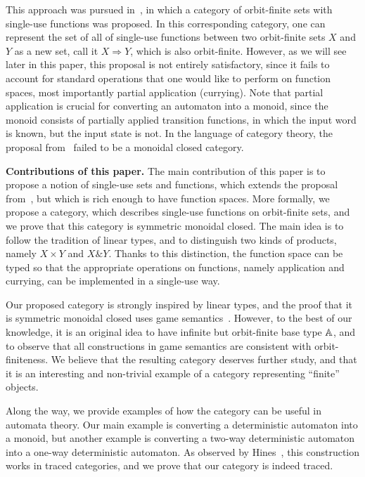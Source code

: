 This approach was pursued in~\cite{stefanski-phd}, in which a category of orbit-finite sets with single-use functions was proposed. In this corresponding category,  one can represent the set of all of single-use functions between two orbit-finite sets $X$ and $Y$ as a new set, call it $X \Rightarrow Y$, which is  also orbit-finite.  However, as we will see later in this paper, this proposal is not entirely satisfactory, since it fails to account for standard operations that one would like to perform on function spaces, most importantly partial application (currying). Note that partial application is crucial for converting an automaton into a monoid, since the monoid consists of partially applied transition functions, in which the input word is known, but the input state is not. In the language of category theory, the proposal from~\cite{stefanski-phd} failed to be a monoidal closed category. 

 \textbf{Contributions of this paper.}
The main contribution of this paper is to propose a notion of single-use sets and functions, which extends the proposal from~\cite{stefanski-phd}, but which is rich enough to have function spaces. More formally, we propose a category, which describes single-use functions on orbit-finite sets, and we prove that this category is symmetric monoidal closed. 
The main idea is to follow the tradition of linear types, and to  distinguish two kinds of products, namely $X \times Y$ and $X \& Y$. Thanks to this distinction, the function space can be typed so that the appropriate operations on functions, namely application and currying, can be implemented in a single-use way. 

Our proposed category is strongly inspired by linear types, and the proof that it is symmetric monoidal closed uses game semantics~\cite{abramsky2013semantics}. However, to the best of our knowledge, it is an original idea to have infinite but orbit-finite base type $\mathbb A$, and to observe that all constructions in game semantics are consistent with orbit-finiteness. We believe that the resulting category deserves further study, and that it is an interesting and non-trivial example of a category representing ``finite'' objects.

Along the way, we provide examples of how the category can be useful in automata theory. Our main example is converting a deterministic automaton into a monoid, but another example is converting a two-way deterministic automaton into a one-way deterministic automaton. As observed by Hines~\cite[Section 4]{hines2003categorical}, this construction works in traced categories, and we prove that our category is indeed traced. 

